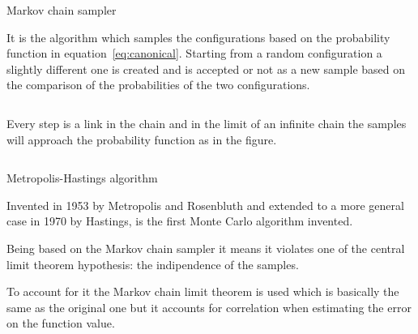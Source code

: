 \documentclass{beamer}
\begin{document}
\begin{frame}{Markov chain sampler}

It is the algorithm which samples the configurations based on the probability
function in equation~\ref{eq:canonical}. Starting from a random configuration
a slightly different one is created and is accepted or not as a new sample
based on the comparison of the probabilities of the two configurations.

\vspace{3mm}

\begin{columns}


Every step is a link in the chain and in the limit of an infinite chain the
samples will approach the probability function as in the figure.

\end{columns}
\end{frame}


\begin{frame}{Metropolis-Hastings algorithm}

Invented in 1953 by Metropolis and Rosenbluth and extended to a more general case
in 1970 by Hastings, is the first Monte Carlo algorithm invented. 

\vspace{3mm}

Being based on the Markov chain sampler it means it violates one of the central 
limit theorem hypothesis: the indipendence of the samples.

\vspace{3mm}

To account for it the Markov chain limit theorem is used which is basically the
same as the original one but it accounts for correlation when estimating the
error on the function value. 

\end{frame}
\end{document}

